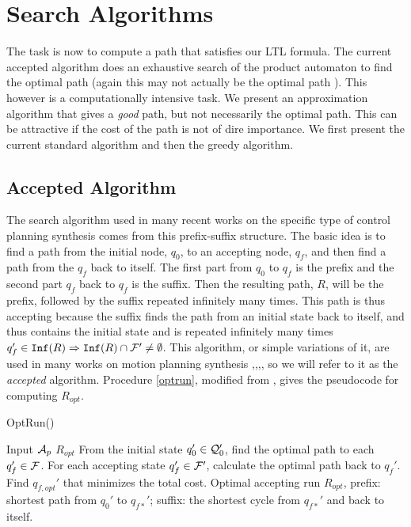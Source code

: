 \chapter{Search Algorithms}
The task is now to compute a path that satisfies our LTL formula. The current accepted algorithm does an exhaustive search of the product automaton to find the optimal path (again this may not actually be the optimal path \cite{schuppan05}). This however is a computationally intensive task. We present an approximation algorithm that gives a \textit{good} path, but not necessarily the optimal path. This can be attractive if the cost of the path is not of dire importance. We first present the current standard algorithm and then the greedy algorithm. 
\section{Accepted Algorithm}
The search algorithm used in many recent works on the specific type of control planning synthesis comes from this prefix-suffix structure. The basic idea is to find a path from the initial node, $q_0$, to an accepting node, $q_f$, and then find a path from the $q_f$ back to itself. The first part from $q_0$ to $q_f$ is the prefix and the second part $q_f$ back to $q_f$ is the suffix. Then the resulting path, $R$, will be the prefix, followed by the suffix repeated infinitely many times. This path is thus accepting because the suffix finds the path from an initial state back to itself, and thus contains the initial state and is repeated infinitely many times $q_f' \in \texttt{Inf} (R)  \Rightarrow \texttt{Inf} (R) \cap \mathcal{F}' \neq \emptyset$. This algorithm, or simple variations of it, are used in many works on motion planning synthesis \cite{guo15},\cite{fainekos09},\cite{kloetzer08},\cite{smith2010}, so we will refer to it as the \textit{accepted} algorithm. Procedure \ref{optrun}, modified from \cite{guo15}, gives the pseudocode for computing $R_{opt}$.


\begin{algorithm}
\caption{OptRun()}\label{optrun}
\begin{algorithmic}[1]
\Require Input $\mathcal{A}_p$
\Ensure $R_{opt}$
\State From the initial state $q_0' \in \mathcal{Q}_0'$, find the optimal path to each $q_f' \in \mathcal{F}$.
\State For each accepting state $q_f' \in \mathcal{F}'$, calculate the optimal path back to $q_f'$. 
\State Find $q_{f,opt}'$ that minimizes the total cost.
\State Optimal accepting run $R_{opt}$, prefix: shortest path from $q_{0}'$ to  $q_{f*}'$; suffix: the shortest cycle from $q_{f*}'$ and back to itself.
\end{algorithmic}
\end{algorithm}

